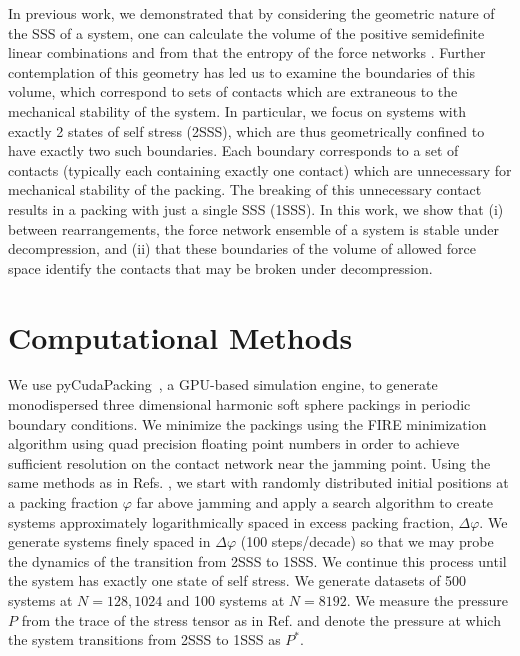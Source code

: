 In previous work, we demonstrated that by considering the geometric nature of the SSS of a system, one can calculate the volume of the positive semidefinite linear combinations and from that the entropy of the force networks \cite{sartor_direct_2020}. Further contemplation of this geometry has led us to examine the boundaries of this volume, which correspond to sets of contacts which are extraneous to the mechanical stability of the system. In particular, we focus on systems with exactly 2 states of self stress (2SSS), which are thus geometrically confined to have exactly two such boundaries. Each boundary corresponds to a set of contacts (typically each containing exactly one contact) which are unnecessary for mechanical stability of the packing. The breaking of this unnecessary contact results in a packing with just a single SSS (1SSS). In this work, we show that (i) between rearrangements, the force network ensemble of a system is stable under decompression, and (ii) that these boundaries of the volume of allowed force space identify the contacts that may be broken under decompression. 


\section{Computational Methods}

We use pyCudaPacking~\cite{charbonneau_universal_2012}, a GPU-based simulation engine, to generate monodispersed three dimensional harmonic soft sphere packings in periodic boundary conditions. 
We minimize the packings using the FIRE minimization algorithm \cite{bitzek_structural_2006} using quad precision floating point numbers in order to achieve sufficient resolution on the contact network near the jamming point.
Using the same methods as in Refs. \cite{sartor_mean-field_2021,morse_echoes_2017}, we start with randomly distributed initial positions at a packing fraction $\varphi$ far above jamming and apply a search algorithm to create systems approximately logarithmically spaced in excess packing fraction, $\Delta\varphi$. We generate systems finely spaced in $\Delta\varphi$ (100 steps/decade) so that we may probe the dynamics of the transition from 2SSS to 1SSS.  
We continue this process until the system has exactly one state of self stress. We generate datasets of 500 systems at $N={128, 1024}$ and 100 systems at $N=8192$.  We measure the pressure $P$ from the trace of the stress tensor as in Ref. \cite{ohern_jamming_2003} and denote the pressure at which the system transitions from 2SSS to 1SSS as $P^*$.

